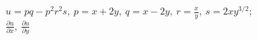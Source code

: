 \item $u = pq - p^2r^2s, \ p = x + 2y, \ q = x - 2y, \ r = \frac{x}{y}, \ s = 2xy^{3/2}$; \\
$\frac{\partial u}{\partial x}, \ \frac{\partial u}{\partial y}$
